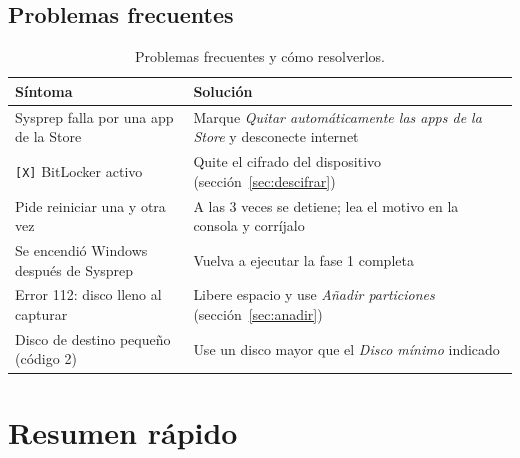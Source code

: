 \documentclass[11pt,a4paper]{report}
\begin{document}
\section{Problemas frecuentes}

\begin{table}[H]
  \centering
  \small
  \begin{tabularx}{\textwidth}{@{}>{\raggedright\arraybackslash}p{4.5cm} X@{}}
    \toprule
    \textbf{Síntoma} & \textbf{Solución} \\
    \midrule
    Sysprep falla por una app de la Store & Marque \emph{Quitar automáticamente las apps de la Store} y desconecte internet \\
    \texttt{[X]} BitLocker activo & Quite el cifrado del dispositivo (sección~\ref{sec:descifrar}) \\
    Pide reiniciar una y otra vez & A las 3 veces se detiene; lea el motivo en la consola y corríjalo \\
    Se encendió Windows después de Sysprep & Vuelva a ejecutar la fase 1 completa \\
    Error 112: disco lleno al capturar & Libere espacio y use \emph{Añadir particiones} (sección~\ref{sec:anadir}) \\
    Disco de destino pequeño (código 2) & Use un disco mayor que el \emph{Disco mínimo} indicado \\
    \bottomrule
  \end{tabularx}
  \caption{Problemas frecuentes y cómo resolverlos.}
\end{table}

\chapter{Resumen rápido}
\end{document}
